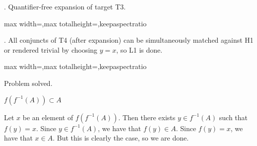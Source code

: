 \documentclass[a4paper,twoside,12pt]{article} %
\makeatletter
\DeclareRobustCommand{\_}{%
  \leavevmode\vbox{%
    \hrule\@width.4em
          \@height-.16ex
          \@depth\dimexpr.16ex+.28pt\relax}}
\newcommand\Tstrut{\rule{0pt}{2.4ex}}
\newcommand\Bstrut{\rule[-1.1ex]{0pt}{0pt}}
\newenvironment{fit}{\begin{adjustbox}{max width=\textwidth,max totalheight=\textheight,keepaspectratio}}{\end{adjustbox}}
\makeatother
\begin{document}
\begin{steps}
. Quantifier-free expansion of target T3.\nopagebreak[4] 
\nopagebreak[4] 
\smallskip\nopagebreak[4] 

\begin{fit}%
\end{fit}
\smallskip

. All conjuncts of T4 (after expansion) can be simultaneously matched against H1 or rendered trivial by choosing $y = x$, so L1 is done.\nopagebreak[4] 
\nopagebreak[4] 
\smallskip\nopagebreak[4] 

\begin{fit}%
\end{fit}

Problem solved.
\cleardoublepage

\end{steps}
{\begin{center} \large \textbf{$f(f^{-1}(A))\subset A$}\end{center}}\nopagebreak[4]

\begin{center}
\begin{minipage}{120mm}
Let $x$ be an element of $f(f^{-1}(A))$. Then there exists $y\in f^{-1}(A)$ such that $f(y) = x$. Since $y\in f^{-1}(A)$, we have that $f(y)\in A$. Since $f(y) = x$, we have that $x\in A$. But this is clearly the case, so we are done.
\end{minipage}
\end{center}
\end{document}
